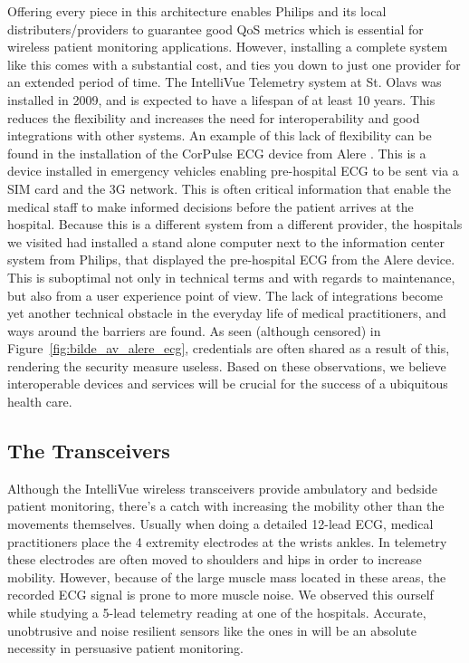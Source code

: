 Offering every piece in this architecture enables Philips and its local distributers/providers to guarantee good QoS metrics which is essential for wireless patient monitoring applications. However, installing a complete system like this comes with a substantial cost, and ties you down to just one provider for an extended period of time. The IntelliVue Telemetry system at St. Olavs was installed in 2009, and is expected to have a lifespan of at least 10 years. This reduces the flexibility and increases the need for interoperability and good integrations with other systems. An example of this lack of flexibility can be found in the installation of the CorPulse ECG device from Alere \cite{alere}. This is a device installed in emergency vehicles enabling pre-hospital ECG to be sent via a SIM card and the 3G network. This is often critical information that enable the medical staff to make informed decisions before the patient arrives at the hospital. Because this is a different system from a different provider, the hospitals we visited had installed a stand alone computer next to the information center system from Philips, that displayed the pre-hospital ECG from the Alere device. This is suboptimal not only in technical terms and with regards to maintenance, but also from a user experience point of view. The lack of integrations become yet another technical obstacle in the everyday life of medical practitioners, and ways around the barriers are found. As seen (although censored) in Figure~\ref{fig:bilde_av_alere_ecg}, credentials are often shared as a result of this, rendering the security measure useless. Based on these observations, we believe interoperable devices and services will be crucial for the success of a ubiquitous health care.


\subsection{The Transceivers} %
\label{sub:the_transceivers}

Although the IntelliVue wireless transceivers provide ambulatory and bedside patient monitoring, there's a catch with increasing the mobility other than the movements themselves. Usually when doing a detailed 12-lead ECG, medical practitioners place the 4 extremity electrodes at the wrists ankles. In telemetry these electrodes are often moved to shoulders and hips in order to increase mobility. However, because of the large muscle mass located in these areas, the recorded ECG signal is prone to more muscle noise. We observed this ourself while studying a 5-lead telemetry reading at one of the hospitals. Accurate, unobtrusive and noise resilient sensors like the ones in \cite{ChulsungPark:2006tf, Anonymous:FtVb5yQr} will be an absolute necessity in persuasive patient monitoring. 

